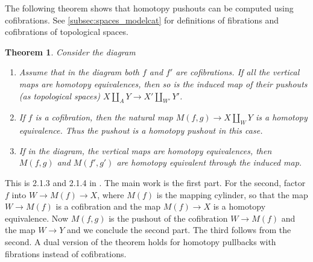 \documentclass{scrartcl}
\theoremstyle{plain}
\newtheorem{theorem}{Theorem}[section]
\theoremstyle{definition}
\renewcommand{\coprod}{\mathbin{\amalg}}
\begin{document}

The following theorem shows that homotopy pushouts can be computed using cofibrations. See \ref{subsec:spaces_modelcat} for definitions of fibrations and cofibrations of topological spaces.
\begin{theorem}\label{thm:homotopy-pushout-properties}
    Consider the diagram

    \begin{center}
    \end{center}

    \begin{enumerate}
    \item Assume that in the diagram 
    both $f$ and $f'$ are cofibrations. If all the vertical maps are homotopy equivalences, then so is the induced map of their pushouts (as topological spaces) $X\coprod_A Y \to X'\coprod_{W'} Y'$.
    \item If $f$ is a cofibration, then the natural map $M(f,g)\to X\coprod_W Y$ is a homotopy equivalence. Thus the pushout is a homotopy pushout in this case. 
    \item If in the diagram, the vertical maps are homotopy equivalences, then $M(f, g)$ and $M(f', g')$ are homotopy equivalent through the induced map.
    \end{enumerate}
\end{theorem}
This is 2.1.3 and 2.1.4 in \cite{may2011more}. The main work is the first part. For the second, factor $f$ into $W\to M(f)\to X$, where $M(f)$ is the mapping cylinder, so that the map $W\to M(f)$ is a cofibration and the map $M(f)\to X$ is a homotopy equivalence. Now $M(f, g)$ is the pushout of the cofibration $W\to M(f)$ and the map $W\to Y$ and we conclude the second part. The third follows from the second. A dual version of the theorem holds for homotopy pullbacks with fibrations instead of cofibrations.
\end{document}
